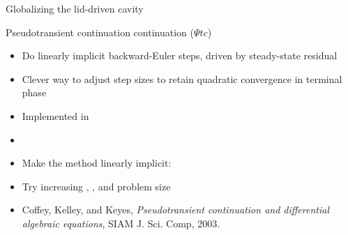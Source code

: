 \begin{frame}{Globalizing the lid-driven cavity}
  \begin{block}{Pseudotransient continuation continuation ($\Psi tc$)}
    \begin{itemize}
    \item Do linearly implicit backward-Euler steps, driven by
      steady-state residual
    \item Clever way to adjust step sizes to retain quadratic
      convergence in terminal phase
    \end{itemize}
  \end{block}
  \begin{itemize}
  \item Implemented in 
  \item {}
  \item Make the method linearly implicit: 
  \item Try increasing , , and problem size
  \item Coffey, Kelley, and Keyes, \emph{Pseudotransient continuation and differential algebraic equations}, SIAM J. Sci. Comp, 2003.
  \end{itemize}
\end{frame}
